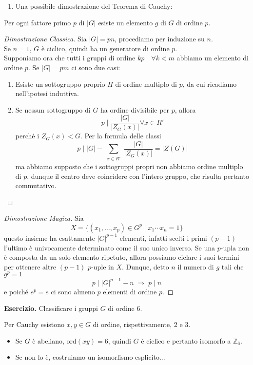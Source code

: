 \begin{multicols}{2}
\begin{enumerate}
	\item Una possibile dimostrazione del Teorema di Cauchy:
\end{enumerate}

\begin{theorem}[di Cauchy] \label{cauchy}
	Per ogni fattore primo $ p $ di $ |G| $ esiste un elemento $ g $ di $ G $ di ordine $ p $.
\end{theorem}
\begin{proof}[Dimostrazione Classica]
	Sia $ |G|= pn $, procediamo per induzione su $ n $. \\
	Se $ n = 1 $, $ G $ è ciclico, quindi ha un generatore di ordine $ p $. \\
	Supponiamo ora che tutti i gruppi di ordine $ kp  \quad\forall k < m$ abbiamo un elemento di ordine $ p $. Se $ |G|=pm $ ci sono due casi:
	\begin{enumerate}
		\item Esiste un sottogruppo proprio $ H $ di ordine multiplo di $ p $, da cui ricadiamo nell'ipotesi induttiva.
		\item Se nessun sottogruppo di $ G $ ha ordine divisibile per $ p $, allora
		\[ p \mid \frac{|G|}{|Z_G(x)|} \forall x \in R' \] perché i $ Z_G(x) < G $. Per la formula delle classi
		\[ p \mid |G| - \sum_{\substack{x \in R'}} \frac{|G|}{|Z_G(x)|} = |Z(G)| \]
		ma abbiamo supposto che i sottogruppi propri non abbiamo ordine multiplo di $ p $, dunque il centro deve coincidere con l'intero gruppo, che risulta pertanto commutativo.
	\end{enumerate}
\end{proof}
\begin{proof}[Dimostrazione Magica]
	Sia $$ X = \{(x_1, \dots, x_p) \in G^p \mid x_1\cdots x_n = 1 \} $$ questo insieme ha esattamente $ |G|^{p-1} $ elementi, infatti scelti i primi $ (p-1) $ l'ultimo è univocamente determinato come il suo unico inverso. Se una $ p $-upla non è composta da un solo elemento ripetuto, allora possiamo ciclare i suoi termini per ottenere altre $ (p-1) $ $ p $-uple in $ X $. Dunque, detto $ n $ il numero di $ g $ tali che $ g^p = 1 $ \[ p \mid |G|^{p-1} - n \;\Rightarrow\; p \mid n \] e poiché $ e^p = e $ ci sono almeno $ p $ elementi di ordine $ p $.
\end{proof}



\textbf{Esercizio.} Classificare i gruppi $ G $ di ordine $ 6 $.

Per Cauchy esistono $ x, y \in G $ di ordine, rispettivamente, 2 e 3.
\begin{itemize}
	\item Se $ G $ è abeliano, ord$ (xy) = 6 $, quindi $ G $ è ciclico e pertanto isomorfo a $ \mathbb{Z}_6 $.
	\item Se non lo è, costruiamo un isomorfismo esplicito...
\end{itemize}


\end{multicols}

